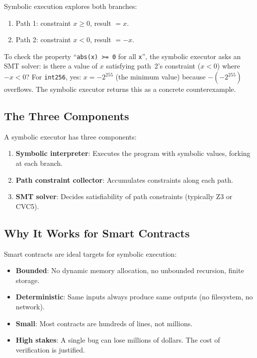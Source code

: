 \documentclass[11pt,a4paper]{article}
\begin{document}
Symbolic execution explores both branches:
\begin{enumerate}[nosep]
  \item Path 1: constraint $x \geq 0$, result $= x$.
  \item Path 2: constraint $x < 0$, result $= -x$.
\end{enumerate}

To check the property ``\texttt{abs(x) >= 0} for all \texttt{x}'', the symbolic executor
asks an SMT solver: is there a value of $x$ satisfying path~2's constraint ($x < 0$)
where $-x < 0$? For \texttt{int256}, yes: $x = -2^{255}$ (the minimum value) because
$-(-2^{255})$ overflows. The symbolic executor returns this as a concrete counterexample.

\subsection{The Three Components}

A symbolic executor has three components:

\begin{enumerate}
  \item \textbf{Symbolic interpreter}: Executes the program with symbolic values, forking
    at each branch.
  \item \textbf{Path constraint collector}: Accumulates constraints along each path.
  \item \textbf{SMT solver}: Decides satisfiability of path constraints (typically Z3 or
    CVC5).
\end{enumerate}

\subsection{Why It Works for Smart Contracts}

Smart contracts are ideal targets for symbolic execution:

\begin{itemize}[nosep]
  \item \textbf{Bounded}: No dynamic memory allocation, no unbounded recursion, finite
    storage.
  \item \textbf{Deterministic}: Same inputs always produce same outputs (no filesystem,
    no network).
  \item \textbf{Small}: Most contracts are hundreds of lines, not millions.
  \item \textbf{High stakes}: A single bug can lose millions of dollars. The cost of
    verification is justified.
\end{itemize}
\end{document}
